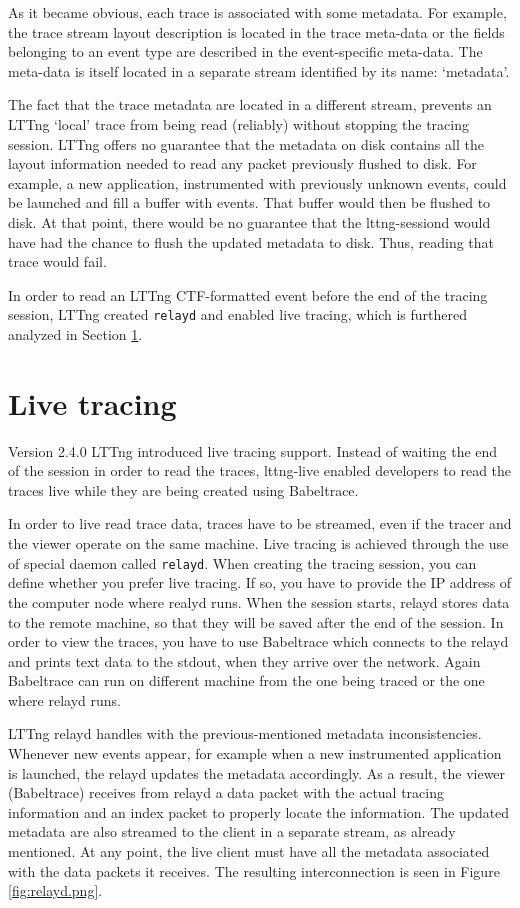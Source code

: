 As it became obvious, each trace is associated with some metadata. For example,
the trace stream layout description is located in the trace meta-data or the
fields belonging to an event type are described in the event-specific meta-data.
The meta-data is itself located in a separate stream identified by its name:
`metadata'.

The fact that the trace metadata are located in a different stream, prevents an
LTTng `local' trace from being read (reliably) without stopping the tracing
session. LTTng offers no guarantee that the metadata on disk contains all the
layout information needed to read any packet previously flushed to disk. For
example, a new application, instrumented with previously unknown events, could
be launched and fill a buffer with events. That buffer would then be flushed to
disk. At that point, there would be no guarantee that the lttng-sessiond would
have had the chance to flush the updated metadata to disk. Thus, reading that
trace would fail.

In order to read an LTTng CTF-formatted event before the end of the tracing
session, LTTng created \texttt{relayd} and enabled live tracing, which is
furthered analyzed in Section \ref{sec:relayd}.

\section{Live tracing}\label{sec:relayd}

Version 2.4.0 LTTng introduced live tracing support. Instead of waiting the
end of the session in order to read the traces, lttng-live enabled developers to
read the traces live while they are being created using Babeltrace. 

In order to live read trace data, traces have to be streamed, even if the tracer
and the viewer operate on the same machine. Live tracing is achieved through the
use of special daemon called \texttt{relayd}. When creating the tracing session,
you can define whether you prefer live tracing. If so, you have to provide the
IP address of the computer node where realyd runs. When the session starts,
relayd stores data to the remote machine, so that they will be saved after the
end of the session. In order to view the traces, you have to use Babeltrace
which connects to the relayd and prints text data to the stdout, when they
arrive over the network. Again Babeltrace can run on different machine from the
one being traced or the one where relayd runs.

LTTng relayd handles with the previous-mentioned metadata inconsistencies.
Whenever new events appear, for example when a new instrumented application is
launched, the relayd updates the metadata accordingly. As a result, the viewer
(Babeltrace) receives from relayd a data packet with the actual tracing
information and an index packet to properly locate the information. The updated
metadata are also streamed to the client in a separate stream, as already
mentioned. At any point, the live client must have all the metadata associated
with the data packets it receives. The resulting interconnection is seen in
Figure \ref{fig:relayd.png}.


